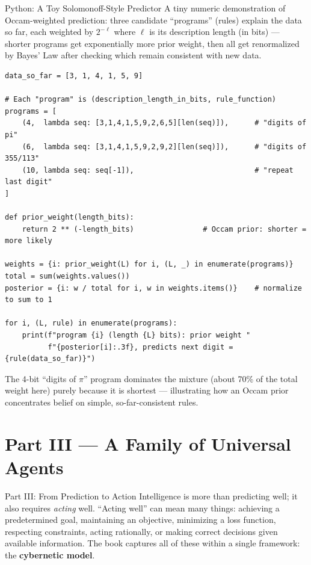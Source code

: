 \documentclass[aspectratio=169,10pt]{beamer}
\begin{document}
\begin{frame}[fragile]{Python: A Toy Solomonoff-Style Predictor}
  A tiny numeric demonstration of Occam-weighted prediction: three
  candidate ``programs'' (rules) explain the data so far, each weighted by
  $2^{-\ell}$ where $\ell$ is its description length (in bits) --- shorter
  programs get exponentially more prior weight, then all get renormalized
  by Bayes' Law after checking which remain consistent with new data.

  \begin{lstlisting}[style=pycode]
data_so_far = [3, 1, 4, 1, 5, 9]

# Each "program" is (description_length_in_bits, rule_function)
programs = [
    (4,  lambda seq: [3,1,4,1,5,9,2,6,5][len(seq)]),      # "digits of pi"
    (6,  lambda seq: [3,1,4,1,5,9,2,9,2][len(seq)]),      # "digits of 355/113"
    (10, lambda seq: seq[-1]),                            # "repeat last digit"
]

def prior_weight(length_bits):
    return 2 ** (-length_bits)                # Occam prior: shorter = more likely

weights = {i: prior_weight(L) for i, (L, _) in enumerate(programs)}
total = sum(weights.values())
posterior = {i: w / total for i, w in weights.items()}    # normalize to sum to 1

for i, (L, rule) in enumerate(programs):
    print(f"program {i} (length {L} bits): prior weight "
          f"{posterior[i]:.3f}, predicts next digit = {rule(data_so_far)}")
  \end{lstlisting}
  The 4-bit ``digits of $\pi$'' program dominates the mixture (about 70\% of
  the total weight here) purely because it is shortest --- illustrating how
  an Occam prior concentrates belief on simple, so-far-consistent rules.
\end{frame}

\section{Part III --- A Family of Universal Agents}

\begin{frame}{Part III: From Prediction to Action}
  Intelligence is more than predicting well; it also requires \emph{acting}
  well. ``Acting well'' can mean many things: achieving a predetermined
  goal, maintaining an objective, minimizing a loss function, respecting
  constraints, acting rationally, or making correct decisions given
  available information. The book captures all of these within a single
  framework: the \textbf{cybernetic model}.
\end{frame}
\end{document}
